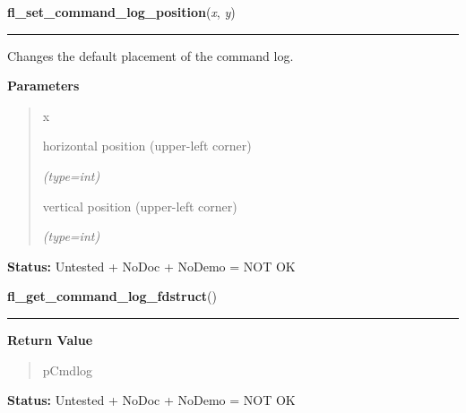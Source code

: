\hspace{.8\funcindent}\begin{boxedminipage}{\funcwidth}

    \raggedright \textbf{fl\_set\_command\_log\_position}(\textit{x}, \textit{y})

    \vspace{-1.5ex}

    \rule{\textwidth}{0.5\fboxrule}
\setlength{\parskip}{2ex}
    Changes the default placement of the command log.

\setlength{\parskip}{1ex}
      \textbf{Parameters}
      \vspace{-1ex}

      \begin{quote}
        \begin{Ventry}{x}

          \item[x]

          horizontal position (upper-left corner)

            {\it (type=int)}

          \item[y]

          vertical position (upper-left corner)

            {\it (type=int)}

        \end{Ventry}

      \end{quote}

\textbf{Status:} Untested + NoDoc + NoDemo = NOT OK



    \end{boxedminipage}

    \label{xformslib:flgoodies:fl_get_command_log_fdstruct}

    \vspace{0.5ex}

\hspace{.8\funcindent}\begin{boxedminipage}{\funcwidth}

    \raggedright \textbf{fl\_get\_command\_log\_fdstruct}()

    \vspace{-1.5ex}

    \rule{\textwidth}{0.5\fboxrule}
\setlength{\parskip}{2ex}
\setlength{\parskip}{1ex}
      \textbf{Return Value}
    \vspace{-1ex}

      \begin{quote}
      pCmdlog

      \end{quote}

\textbf{Status:} Untested + NoDoc + NoDemo = NOT OK



    \end{boxedminipage}

